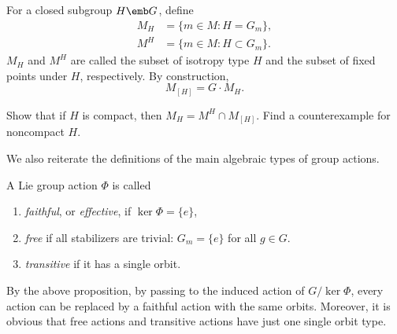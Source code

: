 \begin{defn}\label{def isotropy type}
    For a closed subgroup $H\emb G$, define
    \begin{align}
        M_H&=\{m\in M:H=G_m\},\\
        M^H&=\{m\in M:H\subset G_m\}.
    \end{align}
    $M_H$ and $M^H$ are called the subset of isotropy type $H$ and the subset of fixed points under $H$, respectively. By construction,
    \[M_{[H]}=G\cdot M_H.\]
\end{defn}

\begin{xca}
    Show that if $H$ is compact, then $M_H=M^H\cap M_{[H]}$. Find a counterexample for noncompact $H$.
\end{xca}

We also reiterate the definitions of the main algebraic types of group actions.

\begin{defn}
    A Lie group action $\Phi$ is called
    \begin{enumerate}
        \item \emph{faithful}, or \emph{effective}, if $\ker\Phi=\{e\}$,
        \item \emph{free} if all stabilizers are trivial: $G_m=\{e\}$ for all $g\in G$.
        \item \emph{transitive} if it has a single orbit.
    \end{enumerate}
\end{defn}

By the above proposition, by passing to the induced action of $G\slash\ker\Phi$, every action can be replaced by a faithful action with the same orbits. Moreover, it is obvious that free actions and transitive actions have just one single orbit type.

